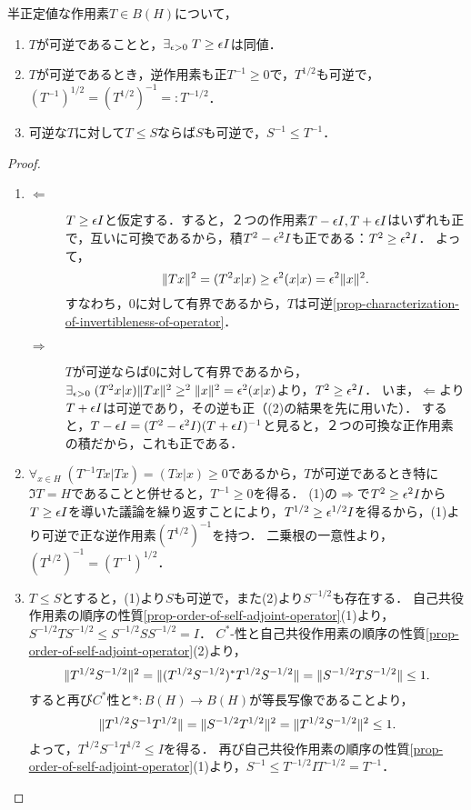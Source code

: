 \documentclass[uplatex,dvipdfmx]{jsreport}
\begin{document}
\begin{proposition}[正作用素の可逆性]
    半正定値な作用素$T\in B(H)$について，
    \begin{enumerate}
        \item $T$が可逆であることと，$\exists_{\epsilon>0}\;T\ge\epsilon I$は同値．
        \item $T$が可逆であるとき，逆作用素も正$T^{-1}\ge 0$で，$T^{1/2}$も可逆で，$(T^{-1})^{1/2}=(T^{1/2})^{-1}=:T^{-1/2}$．
        \item 可逆な$T$に対して$T\le S$ならば$S$も可逆で，$S^{-1}\le T^{-1}$．
    \end{enumerate}
\end{proposition}
\begin{proof}\mbox{}
    \begin{enumerate}
        \item \begin{description}
            \item[$\Leftarrow$] $T\ge\epsilon I$と仮定する．すると，２つの作用素$T-\epsilon I,T+\epsilon I$はいずれも正で，互いに可換であるから，積$T^2-\epsilon^2I$も正である：$T^2\ge\epsilon^2I$．
            よって，
            \[\|Tx\|^2=(T^2x|x)\ge\epsilon^2(x|x)=\epsilon^2\|x\|^2.\]
            すなわち，$0$に対して有界であるから，$T$は可逆\ref{prop-characterization-of-invertibleness-of-operator}．
            \item[$\Rightarrow$]
            $T$が可逆ならば$0$に対して有界であるから，$\exists_{\epsilon>0}\;(T^2x|x)\|Tx\|^2\ge^2\|x\|^2=\epsilon^2(x|x)$より，$T^2\ge\epsilon^2I$．
            いま，$\Leftarrow$より$T+\epsilon I$は可逆であり，その逆も正（(2)の結果を先に用いた）．
            すると，$T-\epsilon I=(T^2-\epsilon^2I)(T+\epsilon I)^{-1}$と見ると，２つの可換な正作用素の積だから，これも正である．
        \end{description}
        \item $\forall_{x\in H}\;(T^{-1}Tx|Tx)=(Tx|x)\ge0$であるから，$T$が可逆であるとき特に$\Im T=H$であることと併せると，$T^{-1}\ge0$を得る．
        (1)の$\Rightarrow$で$T^2\ge\epsilon^2I$から$T\ge\epsilon I$を導いた議論を繰り返すことにより，$T^{1/2}\ge\epsilon^{1/2}I$を得るから，(1)より可逆で正な逆作用素$(T^{1/2})^{-1}$を持つ．
        二乗根の一意性より，$(T^{1/2})^{-1}=(T^{-1})^{1/2}$．
        \item $T\le S$とすると，(1)より$S$も可逆で，また(2)より$S^{-1/2}$も存在する．
        自己共役作用素の順序の性質\ref{prop-order-of-self-adjoint-operator}(1)より，$S^{-1/2}TS^{-1/2}\le S^{-1/2}SS^{-1/2}=I$．
        $C^*$-性と自己共役作用素の順序の性質\ref{prop-order-of-self-adjoint-operator}(2)より，
        \[\|T^{1/2}S^{-1/2}\|^2=\|(T^{1/2}S^{-1/2})^*T^{1/2}S^{-1/2}\|=\|S^{-1/2}TS^{-1/2}\|\le 1.\]
        すると再び$C^*$性と$*:B(H)\to B(H)$が等長写像であることより，
        \[\|T^{1/2}S^{-1}T^{1/2}\|=\|S^{-1/2}T^{1/2}\|^2=\|T^{1/2}S^{-1/2}\|^2\le1.\]
        よって，$T^{1/2}S^{-1}T^{1/2}\le I$を得る．
        再び自己共役作用素の順序の性質\ref{prop-order-of-self-adjoint-operator}(1)より，$S^{-1}\le T^{-1/2}IT^{-1/2}=T^{-1}$．
    \end{enumerate}
\end{proof}
\end{document}

